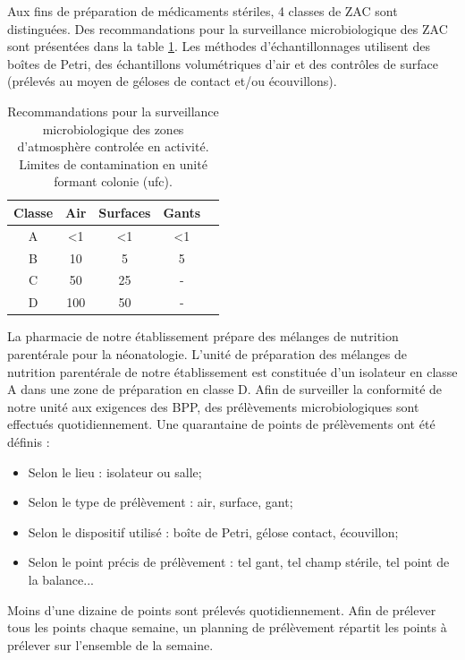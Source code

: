 \documentclass[12pt,a4paper,oneside]{article}
\begin{document}
Aux fins de préparation de médicaments stériles, 4 classes de ZAC sont distinguées. Des recommandations pour la surveillance microbiologique des ZAC sont présentées dans la table \ref{zac}. Les méthodes d'échantillonnages utilisent des boîtes de Petri, des échantillons volumétriques d'air et des contrôles de surface (prélevés au moyen de géloses de contact et/ou écouvillons).
\begin{table}[h]
\caption{Recommandations pour la surveillance microbiologique des zones d'atmosphère controlée en activité. Limites de contamination en unité formant colonie (ufc).\label{zac}}
\begin{center}
\begin{tabular}{|c|c|c|c|c|}
	\hline
	\textbf{Classe} & \textbf{Air} &\textbf{Surfaces} & \textbf{Gants}\\
	\hline
	A & <1 & <1 & <1\\
	B & 10 & 5 & 5\\
	C & 50 & 25 & -\\
	D & 100 & 50 & -\\
	
	\hline
\end{tabular}
\end{center}
\end{table}

La pharmacie de notre établissement prépare des mélanges de nutrition parentérale pour la néonatologie. L'unité de préparation des mélanges de nutrition parentérale de notre établissement est constituée d'un isolateur en classe A dans une zone de préparation en classe D. Afin de surveiller la conformité de notre unité aux exigences des BPP, des prélèvements microbiologiques sont effectués quotidiennement. Une quarantaine de points de prélèvements ont été définis :
\begin{itemize}
 \item Selon le lieu : isolateur ou salle;
 \item Selon le type de prélèvement : air, surface, gant;
 \item Selon le dispositif utilisé : boîte de Petri, gélose contact, écouvillon;
 \item Selon le point précis de prélèvement : tel gant, tel champ stérile, tel point de la balance...
 \end{itemize}
Moins d'une dizaine de points sont prélevés quotidiennement. Afin de prélever tous les points chaque semaine, un planning de prélèvement répartit les points à prélever sur l'ensemble de la semaine.
\end{document}
